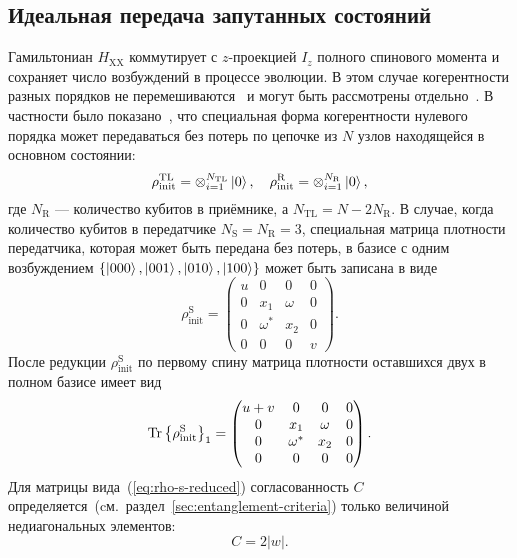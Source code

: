 \subsection{Идеальная передача запутанных состояний}

Гамильтониан $H_\mathrm{XX}$ коммутирует с $z$-проекцией $I_z$ полного спинового момента
и сохраняет число возбуждений в процессе эволюции.
В этом случае когерентности разных порядков не перемешиваются~\cite{Feldman2017} и могут быть рассмотрены отдельно~\cite{Bochkin2018qip}.
В частности было показано~\cite{Feldman2021},
что специальная форма когерентности нулевого порядка может передаваться без потерь
по цепочке из $N$ узлов находящейся в основном состоянии:
%
\begin{equation}
  \rho^\mathrm{TL}_\mathrm{init} = \otimes^{N_\mathrm{TL}}_{i=1}\left| 0 \right\rangle,
  \quad
  \rho^\mathrm{R}_\mathrm{init} = \otimes^{N_\mathrm{R}}_{i=1}\left| 0 \right\rangle,
\end{equation}
%
где $N_\mathrm{R}$ --- количество кубитов в приёмнике,
а $N_\mathrm{TL}  = N - 2 N_\mathrm{R}$.
В случае, когда количество кубитов в передатчике $N_\mathrm{S} = N_\mathrm{R} = 3$,
специальная матрица плотности передатчика,
которая может быть передана без потерь,
в базисе с одним возбуждением
$\left \{\left| 000 \right\rangle, \left| 001 \right\rangle, \left| 010 \right\rangle, \left| 100 \right\rangle \right\}$
может быть записана в виде
%
\begin{equation}
  \rho^\mathrm{S}_\mathrm{init} =
  \begin{pmatrix}
    u &    0     &    0    & 0 \\
    0 &   x_1    & \omega  & 0 \\
    0 & \omega^* &   x_2   & 0 \\
    0 &    0     &    0    & v
  \end{pmatrix}.
\end{equation}
%
После редукции $\rho^\mathrm{S}_\mathrm{init}$ по первому спину
матрица плотности оставшихся двух в полном базисе имеет вид
\begin{equation}\label{eq:rho-s-reduced}
  \mathrm{Tr} \left\{ \rho^\mathrm{S}_\mathrm{init} \right\}_{1} =
  \begin{pmatrix}
    u + v &    0     &    0    & 0 \\
    0     &   x_1    & \omega  & 0 \\
    0     & \omega^* &   x_2   & 0 \\
    0     &    0     &    0    & 0
  \end{pmatrix}.
\end{equation}
Для матрицы вида~(\ref{eq:rho-s-reduced}) согласованность $C$
определяется~(cм.~раздел~\ref{sec:entanglement-criteria}) только величиной недиагональных элементов:
%
\begin{equation}
  C = 2 |w|.
\end{equation}


